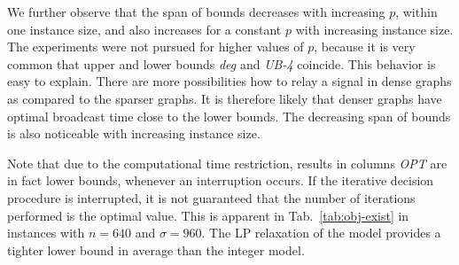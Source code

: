 We further observe that the span of bounds decreases with increasing $p$, within one instance size, and also increases for a constant $p$ with increasing instance size.
The experiments were not pursued for higher values of $p$, because it is very common that upper and lower bounds \emph{deg} and \emph{UB-4} coincide.
This behavior is easy to explain.
There are more possibilities how to relay a signal in dense graphs as compared to the sparser graphs. 
It is therefore likely that denser graphs have optimal broadcast time close to the lower bounds.
The decreasing span of bounds is also noticeable with increasing instance size.

Note that due to the computational time restriction, results in columns \emph{OPT} are in fact lower bounds, whenever an interruption occurs.
If the iterative decision procedure is interrupted, it is not guaranteed that the number of iterations performed is the optimal value.
This is apparent in Tab.~\ref{tab:obj-exist} in instances with $n=640$ and $\sigma=960$. 
The LP relaxation of the model provides a tighter lower bound in average than the integer model.

